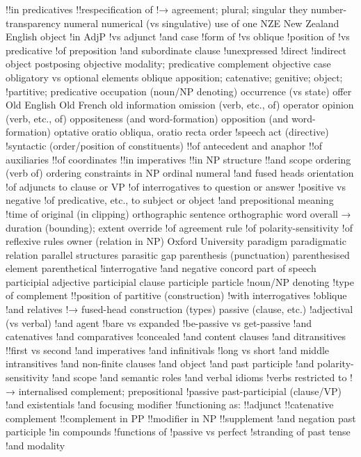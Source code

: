 !!in predicatives
!!respecification of
!→ agreement; plural; singular they
number-transparency
numeral
numerical (vs singulative) use of one
NZE New Zealand English
object
!in AdjP
!vs adjunct
!and case
!form of
!vs oblique
!position of
!vs predicative
!of preposition
!and subordinate clause
!unexpressed
!direct
!indirect
object postposing
objective modality; predicative complement
objective case
obligatory vs optional elements
oblique apposition; catenative; genitive; object;
!partitive; predicative
occupation (noun/NP denoting)
occurrence (vs state)
offer
Old English
Old French
old information
omission (verb, etc., of)
operator
opinion (verb, etc., of)
oppositeness (and word-formation)
opposition (and word-formation)
optative
oratio obliqua, oratio recta
order
!speech act (directive)
!syntactic (order/position of constituents)
!!of antecedent and anaphor
!!of auxiliaries
!!of coordinates
!!in imperatives
!!in NP structure
!!and scope
ordering (verb of)
ordering constraints in NP
ordinal numeral
!and fused heads
orientation
!of adjuncts to clause or VP
!of interrogatives to question or answer
!positive vs negative
!of predicative, etc., to subject or object
!and prepositional meaning
!time of
original (in clipping)
orthographic sentence
orthographic word
overall → duration (bounding); extent
override
!of agreement rule
!of polarity-sensitivity
!of reflexive rules
owner (relation in NP)
Oxford University
paradigm
paradigmatic relation
parallel structures
parasitic gap
parenthesis (punctuation)
parenthesised element
parenthetical
!interrogative
!and negative concord
part of speech
participial adjective
participial clause
participle
particle
!noun/NP denoting
!type of complement
!!position of
partitive (construction)
!with interrogatives
!oblique
!and relatives
!→ fused-head construction (types)
passive (clause, etc.)
!adjectival (vs verbal)
!and agent
!bare vs expanded
!be-passive vs get-passive
!and catenatives
!and comparatives
!concealed
!and content clauses
!and ditransitives
!!first vs second
!and imperatives
!and infinitivals
!long vs short
!and middle intransitives
!and non-finite clauses
!and object
!and past participle
!and polarity-sensitivity
!and scope
!and semantic roles
!and verbal idioms
!verbs restricted to
!→ internalised complement; prepositional
!passive
past-participial (clause/VP)
!and existentials
!and focusing modifier
!functioning as:
!!adjunct
!!catenative complement
!!complement in PP
!!modifier in NP
!!supplement
!and negation
past participle
!in compounds
!functions of
!passive vs perfect
!stranding of
past tense
!and modality
